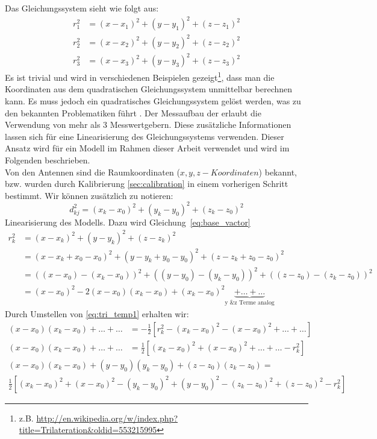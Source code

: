 %
Das Gleichungssystem sieht wie folgt aus:
%
\begin{align}
	r_{1}^2 &= (x-x_1)^2+(y-y_1)^2+(z-z_1)^2 \nonumber\\
	r_{2}^2 &= (x-x_2)^2+(y-y_2)^2+(z-z_2)^2 \nonumber\\
	r_{3}^2 &= (x-x_3)^2+(y-y_3)^2+(z-z_3)^2 \nonumber
%	
\end{align}
%
Es ist trivial und wird in verschiedenen Beispielen gezeigt\footnote{z.B. \url{http://en.wikipedia.org/w/index.php?title=Trilateration&oldid=553215995}}, dass man die Koordinaten aus dem quadratischen Gleichungssystem unmittelbar berechnen kann. Es muss jedoch ein quadratisches Gleichungssystem gelöst werden, was zu den bekannten Problematiken führt \cite{}. Der Messaufbau der \amedogmbh erlaubt die Verwendung von mehr als 3 Messwertgebern. Diese zusätzliche Informationen lassen sich für eine Linearisierung des Gleichungssystems verwenden. Dieser Ansatz wird für ein Modell im Rahmen dieser Arbeit verwendet und wird im Folgenden beschrieben.\\
%
Von den Antennen sind die Raumkoordinaten ($x,y,z-Koordinaten$) bekannt, bzw. wurden durch Kalibrierung \ref{sec:calibration} in einem vorherigen Schritt bestimmt. Wir können zusätzlich zu notieren:
%
\begin{equation}\label{eq:d_k0}
	d_{kj}^2= (x_k-x_0)^2+(y_k-y_0)^2+(z_k-z_0)^2
\end{equation}
%
Linearisierung des Modells. Dazu wird Gleichung~\ref{eq:base_vactor}
%
\begin{align}
	r_{k}^2 &= (x-x_k)^2+(y-y_k)^2+(z-z_k)^2 \nonumber \\
	&=(x-x_k+x_0-x_0)^2+(y-y_k+y_0-y_0)^2+(z-z_k+z_0-z_0)^2 \nonumber \\
	&=((x-x_0)-(x_k-x_0))^2+((y-y_0)-(y_k-y_0))^2+((z-z_0)-(z_k-z_0))^2 \nonumber \\ 
	&=(x-x_0)^2-2(x-x_0)(x_k-x_0)+(x_k-x_0)^2\underbrace{+\dots{}+\dots{}}_\text{y \& z Terme analog}\label{eq:tri_temp1}
%
\end{align}
%
Durch Umstellen von \eqref{eq:tri_temp1} erhalten wir:
\begin{align}
(x-x_0)(x_k-x_0)+\dots{}+\dots{}&= -\frac{1}{2}[r_k^2-(x_k-x_0)^2 -(x-x_0)^2 +\dots{} +\dots{}]\nonumber\\
(x-x_0)(x_k-x_0)+\dots{}+\dots{}&= \frac{1}{2}[(x_k-x_0)^2 +(x-x_0)^2 +\dots{}+\dots{}-r_k^2]\nonumber
%
\end{align}
%
\begin{multline}\label{eq:rk_final}
(x-x_0)(x_k-x_0)+(y-y_0)(y_k-y_0)+(z-z_0)(z_k-z_0)= \\\frac{1}{2}[(x_k-x_0)^2+(x-x_0)^2-(y_k-y_0)^2 +(y-y_0)^2-(z_k-z_0)^2 +(z-z_0)^2-r_k^2]
\end{multline}

